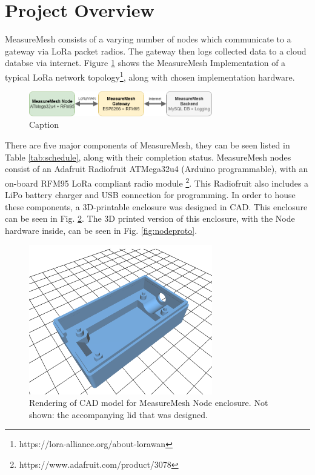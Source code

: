 \documentclass{IEEEtran}
\begin{document}
\section{Project Overview} 

MeasureMesh consists of a varying number of nodes which communicate to a gateway via LoRa packet radios. The gateway then logs collected data to a cloud databse via internet. Figure \ref{fig:mmoverview} shows the MeasureMesh Implementation of a typical LoRa network topology\footnote{https://lora-alliance.org/about-lorawan}, along with chosen implementation hardware.



\begin{figure}[h!]
    \centering
    \includegraphics[width=8cm]{images/ComonentOverview.png}
    \caption{Caption}
    \label{fig:mmoverview}
\end{figure}


There are five major components of MeasureMesh, they can be seen listed in Table \ref{tab:schedule}, along with their completion status. MeasureMesh nodes consist of an Adafruit Radiofruit ATMega32u4 (Arduino programmable), with an on-board RFM95 LoRa compliant radio module \footnote{https://www.adafruit.com/product/3078}. This Radiofruit also includes a LiPo battery charger and USB connection for programming. In order to house these components, a 3D-printable enclosure was designed in CAD. This enclosure can be seen in Fig. \ref{fig:enclosure}. The 3D printed version of this enclosure, with the Node hardware inside, can be seen in Fig. \ref{fig:nodeproto}. 

\begin{figure}
    \centering
    \includegraphics[width=8cm]{images/NodeEnclosure}
    \caption{Rendering of CAD model for MeasureMesh Node enclosure. Not shown: the accompanying lid that was designed.}
    \label{fig:enclosure}
\end{figure}
\end{document}
